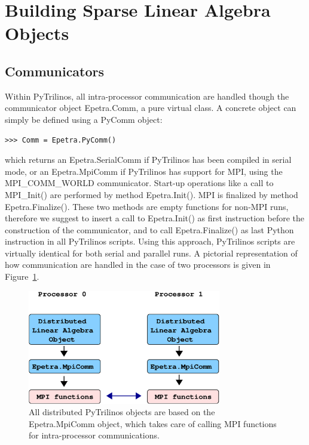 \documentclass[10pt,relax]{SANDreport}
\begin{document}
\section{Building Sparse Linear Algebra Objects}
\label{sec:building}

\subsection{Communicators}
\label{sec:communicators}

Within PyTrilinos, all intra-processor communication are handled though the
communicator object Epetra.Comm, a pure virtual class. A concrete object can
simply be defined using a PyComm object:
\begin{verbatim}
>>> Comm = Epetra.PyComm()
\end{verbatim}
which returns an Epetra.SerialComm if PyTrilinos has been compiled in serial
mode, or an Epetra.MpiComm if PyTrilinos has support for MPI, using the
MPI\_COMM\_WORLD communicator. Start-up operations like a call to MPI\_Init()
  are performed by method Epetra.Init(). MPI is finalized by method
  Epetra.Finalize(). These two methods are empty functions for non-MPI runs,
  therefore we suggest to insert a call to Epetra.Init() as first instruction
  before the construction of the communicator, and to call Epetra.Finalize()
  as last Python instruction in all PyTrilinos scripts. Using this approach, 
PyTrilinos scripts are virtually identical for both serial and
parallel runs. A pictorial representation of how communication are handled in
the case of two  processors is given in Figure~\ref{fig:distributed}.

\begin{figure}
\begin{center}
\includegraphics[height=5cm]{distributed_object.eps}
\caption{All distributed PyTrilinos objects are based on the Epetra.MpiComm
  object, which takes care of calling MPI functions for intra-processor
    communications.}
\label{fig:distributed}
\end{center}
\end{figure}
\end{document}
